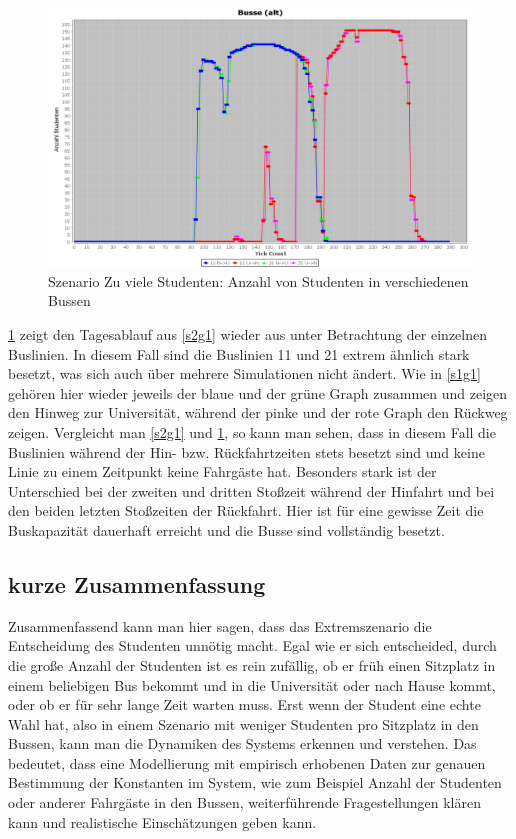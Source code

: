\documentclass[12pt,a4paper]{scrartcl}
\begin{document}
\begin{figure}
\includegraphics[scale=0.4]{Viele_Studenten_Busse.png}
\caption{Szenario \glqq Zu viele Studenten\grqq : Anzahl von Studenten in verschiedenen Bussen}
\label{s2g2}
\end{figure}

\ref{s2g2} zeigt den Tagesablauf aus \ref{s2g1} wieder aus unter Betrachtung der einzelnen Buslinien. In diesem Fall sind die Buslinien 11 und 21 extrem ähnlich stark besetzt, was sich auch über mehrere Simulationen nicht ändert. Wie in \ref{s1g1} gehören hier wieder jeweils der blaue und der grüne Graph zusammen und zeigen den Hinweg zur Universität, während der pinke und der rote Graph den Rückweg zeigen. Vergleicht man \ref{s2g1} und \ref{s2g2}, so kann man sehen, dass in diesem Fall die Buslinien während der Hin- bzw. Rückfahrtzeiten stets besetzt sind und keine Linie zu einem Zeitpunkt keine Fahrgäste hat. Besonders stark ist der Unterschied bei der zweiten und dritten Stoßzeit während der Hinfahrt und bei den beiden letzten Stoßzeiten der Rückfahrt. Hier ist für eine gewisse Zeit die Buskapazität dauerhaft erreicht und die Busse sind vollständig besetzt.


\subsection{kurze Zusammenfassung}\label{graphenzsm}
Zusammenfassend kann man hier sagen, dass das Extremszenario die Entscheidung des Studenten unnötig macht. Egal wie er sich entscheided, durch die große Anzahl der Studenten ist es rein zufällig, ob er früh einen Sitzplatz in einem beliebigen Bus bekommt und in die Universität oder nach Hause kommt, oder ob er für sehr lange Zeit warten muss. Erst wenn der Student eine echte Wahl hat, also in einem Szenario mit weniger Studenten pro Sitzplatz in den Bussen, kann man die Dynamiken des Systems erkennen und verstehen. Das bedeutet, dass eine Modellierung mit empirisch erhobenen Daten zur genauen Bestimmung der Konstanten im System, wie zum Beispiel Anzahl der Studenten oder anderer Fahrgäste in den Bussen, weiterführende Fragestellungen klären kann und realistische Einschätzungen geben kann.
\end{document}
